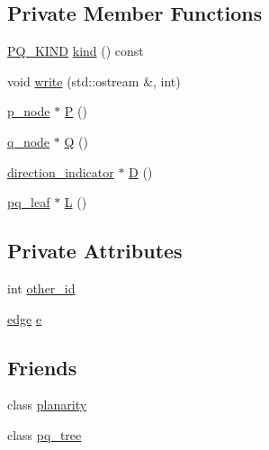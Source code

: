 \subsection*{Private Member Functions}
\begin{DoxyCompactItemize}
\item 
\mbox{\hyperlink{classpq__node_a96827bdca8bf81d20213405dd27f8fa6}{P\+Q\+\_\+\+K\+I\+ND}} \mbox{\hyperlink{classpq__leaf_a31c4b7512aae53901bb20308fe3a8834}{kind}} () const
\item 
void \mbox{\hyperlink{classpq__leaf_a5072c4b54cb0ee3f906e1f44ec03cd79}{write}} (std\+::ostream \&, int)
\item 
\mbox{\hyperlink{classp__node}{p\+\_\+node}} $\ast$ \mbox{\hyperlink{classpq__leaf_a26b5bc998de77c10430b9406ed06f2ce}{P}} ()
\item 
\mbox{\hyperlink{classq__node}{q\+\_\+node}} $\ast$ \mbox{\hyperlink{classpq__leaf_aa5816a18a112ab2e26cd971f4ab4aa8f}{Q}} ()
\item 
\mbox{\hyperlink{classdirection__indicator}{direction\+\_\+indicator}} $\ast$ \mbox{\hyperlink{classpq__leaf_a6abf6b0445fe1e5f906e3533d17d5eec}{D}} ()
\item 
\mbox{\hyperlink{classpq__leaf}{pq\+\_\+leaf}} $\ast$ \mbox{\hyperlink{classpq__leaf_a0445b0e4084239950416c8643c3fd69d}{L}} ()
\end{DoxyCompactItemize}
\subsection*{Private Attributes}
\begin{DoxyCompactItemize}
\item 
int \mbox{\hyperlink{classpq__leaf_a4f4e0c05ee8e704fb1be7b04bae11b43}{other\+\_\+id}}
\item 
\mbox{\hyperlink{classedge}{edge}} \mbox{\hyperlink{classpq__leaf_a9edebd6049b8633158d7f1db3c33ee7c}{e}}
\end{DoxyCompactItemize}
\subsection*{Friends}
\begin{DoxyCompactItemize}
\item 
class \mbox{\hyperlink{classpq__leaf_ab6a02224dbc06343d95919289aec77c8}{planarity}}
\item 
class \mbox{\hyperlink{classpq__leaf_a0a5be4bb438c891059fae98f607f2a9c}{pq\+\_\+tree}}
\end{DoxyCompactItemize}


